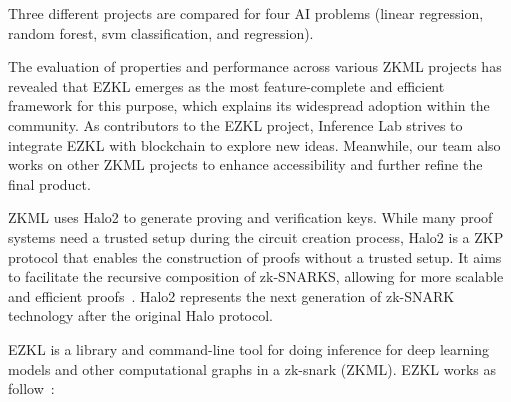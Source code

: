 \documentclass[conference]{IEEEtran}
\begin{document}
Three different projects are compared for four AI problems (linear regression, random forest, svm classification, and regression).

The evaluation of properties and performance across various ZKML projects has revealed that EZKL emerges as the most feature-complete and efficient framework for this purpose, which explains its widespread adoption within the community. As contributors to the EZKL project, Inference Lab strives to integrate EZKL with blockchain to explore new ideas. Meanwhile, our team also works on other ZKML projects to enhance accessibility and further refine the final product.

ZKML uses Halo2 to generate proving and verification keys. While many proof systems need a trusted setup during the circuit creation process, Halo2 is a ZKP protocol that enables the construction of proofs without a trusted setup. It aims to facilitate the recursive composition of zk-SNARKS, allowing for more scalable and efficient proofs~\cite{ZcashHalo2GH}. Halo2 represents the next generation of zk-SNARK technology after the original Halo protocol.

EZKL is a library and command-line tool for doing inference for deep learning models and other computational graphs in a zk-snark (ZKML). EZKL works as follow~\cite{ZconduitEZKLGH}:
\end{document}
